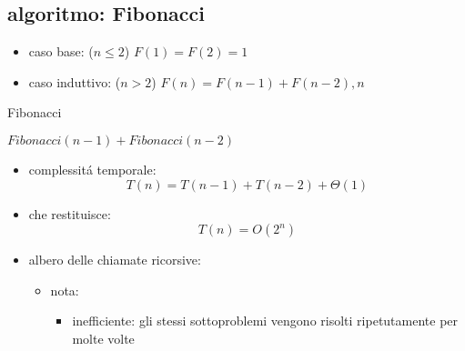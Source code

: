 \subsection*{algoritmo: Fibonacci}
\begin{flushleft}
	\begin{itemize}
		\item caso base: ($n\leq 2$) $F(1)=F(2)=1$
		\item caso induttivo: ($n>2$) $F(n)=F(n-1)+F(n-2),n$
	\end{itemize}
	\begin{algorithm}
		\caption{Fibonacci}
		\begin{algorithmic}
			\ELSE
				\RETURN $Fibonacci(n-1)+Fibonacci(n-2)$
			\ENDIF
		\end{algorithmic}
	\end{algorithm}
	\begin{itemize}
		\item complessit\'a temporale:
			$$T(n)=T(n-1)+T(n-2)+\Theta(1)$$
		\item che restituisce:
			$$T(n)=O(2^n)$$
		\item albero delle chiamate ricorsive:
		\begin{itemize}
			\item nota:
			\begin{itemize}
				\item inefficiente: gli stessi sottoproblemi vengono risolti ripetutamente per molte volte
			\end{itemize}
		\end{itemize}
	\end{itemize}
\end{flushleft}


